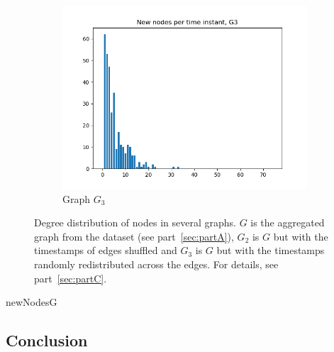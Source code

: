 \documentclass[letterpaper]{article}
\begin{document}
\begin{figure}
\begin{subfigure}[b]{0.32\textwidth}
        \includegraphics[width=\textwidth]{img/newNodesG3.png}
        \caption{Graph \(G_3\)}
	    \label{fig:degree_distribution_G3}
    \end{subfigure}
    \caption{\small{Degree distribution of nodes in several graphs. \(G\) is the aggregated graph from the dataset (see part~\ref{sec:partA}), \(G_2\) is \(G\) but with the timestamps of edges shuffled and \(G_3\) is \(G\) but with the timestamps randomly redistributed across the edges. For details, see part~\ref{sec:partC}.}}
    \label{fig:degree_distribution}
\end{figure}

newNodesG


\subsection*{Conclusion}
\todo{}
\end{document}
